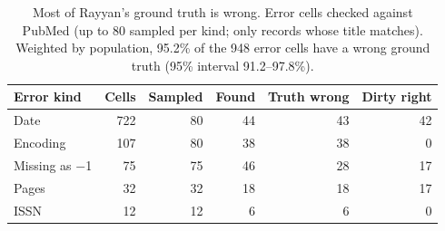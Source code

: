 \begin{table}[t]
  \caption{Most of Rayyan's ground truth is wrong. Error cells checked against PubMed (up to 80 sampled per kind;
  only records whose title
  matches). Weighted by population, 95.2\% of the 948 error cells have a wrong ground truth (95\% interval 91.2--97.8\%).}
  \label{tab:rayyan}
  \small
  \begin{tabular}{@{}lrrrrr@{}}
    \toprule
    Error kind & Cells & Sampled & Found & Truth wrong & Dirty right \\
    \midrule
    Date & 722 & 80 & 44 & 43 & 42 \\
    Encoding & 107 & 80 & 38 & 38 & 0 \\
    Missing as $-$1 & 75 & 75 & 46 & 28 & 17 \\
    Pages & 32 & 32 & 18 & 18 & 17 \\
    ISSN & 12 & 12 & 6 & 6 & 0 \\
    \bottomrule
  \end{tabular}
\end{table}
